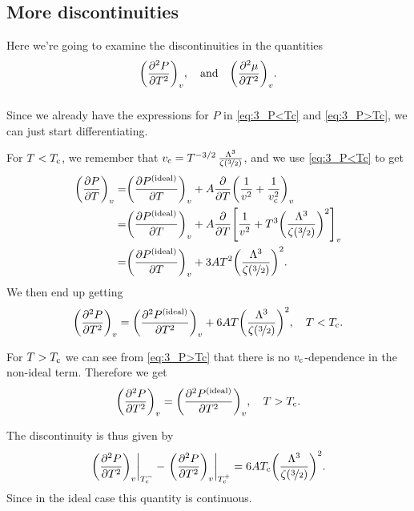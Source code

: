 \documentclass[11pt,letter, swedish, english
]{article}
\begin{document}
\subsection{More discontinuities}
Here we're going to examine the discontinuities in the quantities
\begin{equation}
\qty(\pdv[2]{P}{T})_v \qcomma\text{and}\quad
\qty(\pdv[2]{\mu}{T})_v.
\end{equation}

\subsubsection{}
Since we already have the expressions for $P$ in \eqref{eq:3_P<Tc} and
\eqref{eq:3_P>Tc}, we can just start differentiating.

For $T<T_{\text{c}}$, we remember that
$v_{\text{c}}=T^{-3/2}\,\frac{\Lambda^3}{\zeta(\nicefrac{3}{2})}$, and we use
\eqref{eq:3_P<Tc} to get
\begin{equation}
\begin{aligned}
\qty(\pdv{P}{T})_v=&\qty(\pdv{P^\text{{(ideal)}}}{T})_v
+A\pdv{T}\qty(\frac{1}{v^2}+\frac{1}{v_{\text{c}}^2})_v\\
=&\qty(\pdv{P^\text{{(ideal)}}}{T})_v
+A\pdv{T}\qty[\frac{1}{v^2}+T^3\qty(\frac{\Lambda^3}{\zeta(\nicefrac{3}{2})})^2]_v\\
=&\qty(\pdv{P^\text{{(ideal)}}}{T})_v
+3AT^2\qty(\frac{\Lambda^3}{\zeta(\nicefrac{3}{2})})^2.
\end{aligned}
\end{equation}
We then end up getting
\begin{equation}
\qty(\pdv[2]{P}{T})_v=\qty(\pdv[2]{\ideal{P}}{T})_v
+6AT\qty(\frac{\Lambda^3}{\zeta(\nicefrac{3}{2})})^2
\qcomma T<\Tc.
\end{equation}

For $T>T_{\text{c}}$ we can see from \eqref{eq:3_P>Tc} that there is no
$v_{\text{c}}$-dependence in the non-ideal term. Therefore we get
\begin{equation}
\qty(\pdv[2]{P}{T})_v=\qty(\pdv[2]{\ideal{P}}{T})_v
\qcomma T>\Tc.
\end{equation}

The discontinuity is thus given by
\begin{equation}\label{eq:3_discont._P}
\eval{\qty(\pdv[2]{P}{T})_v}_{\Tc^-}
-\eval{\qty(\pdv[2]{P}{T})_v}_{\Tc^+}
=6A\Tc\qty(\frac{\Lambda^3}{\zeta(\nicefrac{3}{2})})^2.
\end{equation}
Since in the ideal case this quantity is continuous\footnotemark{}.
\end{document}
